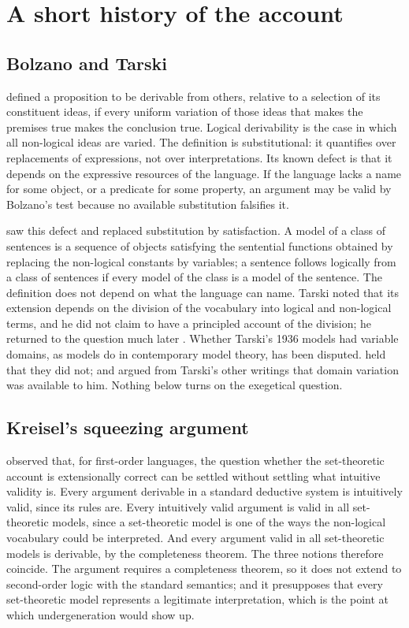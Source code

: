 \documentclass{situationist-preprint}
\begin{document}
\section{A short history of the account}

\subsection{Bolzano and Tarski}

\citet[\S 155]{Bolzano1837} defined a proposition to be derivable from others, relative to a selection of its constituent ideas, if every uniform variation of those ideas that makes the premises true makes the conclusion true. Logical derivability is the case in which all non-logical ideas are varied. The definition is substitutional: it quantifies over replacements of expressions, not over interpretations. Its known defect is that it depends on the expressive resources of the language. If the language lacks a name for some object, or a predicate for some property, an argument may be valid by Bolzano's test because no available substitution falsifies it.

\citet{Tarski1936} saw this defect and replaced substitution by satisfaction. A model of a class of sentences is a sequence of objects satisfying the sentential functions obtained by replacing the non-logical constants by variables; a sentence follows logically from a class of sentences if every model of the class is a model of the sentence. The definition does not depend on what the language can name. Tarski noted that its extension depends on the division of the vocabulary into logical and non-logical terms, and he did not claim to have a principled account of the division; he returned to the question much later \citep{Tarski1986}. Whether Tarski's 1936 models had variable domains, as models do in contemporary model theory, has been disputed. \citet{Etchemendy1990} held that they did not; \citet{GomezTorrente1996} and \citet{Mancosu2006} argued from Tarski's other writings that domain variation was available to him. Nothing below turns on the exegetical question.

\subsection{Kreisel's squeezing argument}

\citet{Kreisel1967} observed that, for first-order languages, the question whether the set-theoretic account is extensionally correct can be settled without settling what intuitive validity is. Every argument derivable in a standard deductive system is intuitively valid, since its rules are. Every intuitively valid argument is valid in all set-theoretic models, since a set-theoretic model is one of the ways the non-logical vocabulary could be interpreted. And every argument valid in all set-theoretic models is derivable, by the completeness theorem. The three notions therefore coincide. The argument requires a completeness theorem, so it does not extend to second-order logic with the standard semantics; and it presupposes that every set-theoretic model represents a legitimate interpretation, which is the point at which undergeneration would show up.
\end{document}
